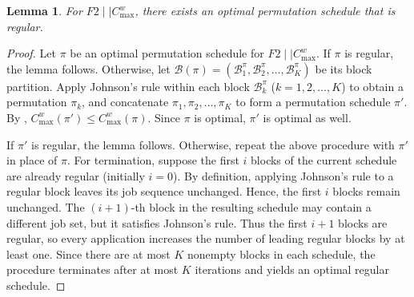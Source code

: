 \documentclass[12pt]{article} \textheight=24.5cm \textwidth=16.5cm \parskip = 0.165cm
\newtheorem{lemma}{Lemma}[section]
\renewcommand{\thefigure}{\arabic{figure}}
\begin{document}
\begin{sloppypar}
\begin{figure}[H]
        \end{figure}
        
        \begin{lemma}\label{lem:regular-schedule}
            For $F2 \mid \mid C_{\max}^w$, there exists an optimal permutation schedule that is regular.
        \end{lemma}
        
        \begin{proof}
            Let $\pi$ be an optimal permutation schedule for $F2 \mid \mid C_{\max}^w$.
            If $\pi$ is regular, the lemma follows.
            Otherwise, let $\mathcal{B}(\pi)=(\mathcal{B}_1^{\pi}, \mathcal{B}_2^{\pi}, \ldots, \mathcal{B}_K^{\pi})$ be its block partition.
            Apply Johnson’s rule within each block $\mathcal{B}_k^{\pi}$ ($k=1, 2, \ldots, K$) to obtain a permutation $\pi_k$, and concatenate $\pi_1, \pi_2, \ldots, \pi_K$ to form a permutation schedule $\pi'$.
            By , $C_{\max}^w(\pi') \leq C_{\max}^w(\pi)$.
            Since $\pi$ is optimal, $\pi'$ is optimal as well.
            
            If $\pi'$ is regular, the lemma follows.
            Otherwise, repeat the above procedure with $\pi'$ in place of $\pi$.
            For termination, suppose the first $i$ blocks of the current schedule are already regular (initially $i=0$).
            By definition, applying Johnson's rule to a regular block leaves its job sequence unchanged.
            Hence, the first $i$ blocks remain unchanged.
            The $(i+1)$-th block in the resulting schedule may contain a different job set, but it satisfies Johnson's rule.
            Thus the first $i+1$ blocks are regular, so every application increases the number of leading regular blocks by at least one.
            Since there are at most $K$ nonempty blocks in each schedule, the procedure terminates after at most $K$ iterations and yields an optimal regular schedule.
        \end{proof}
        

\end{sloppypar}
\end{document}
